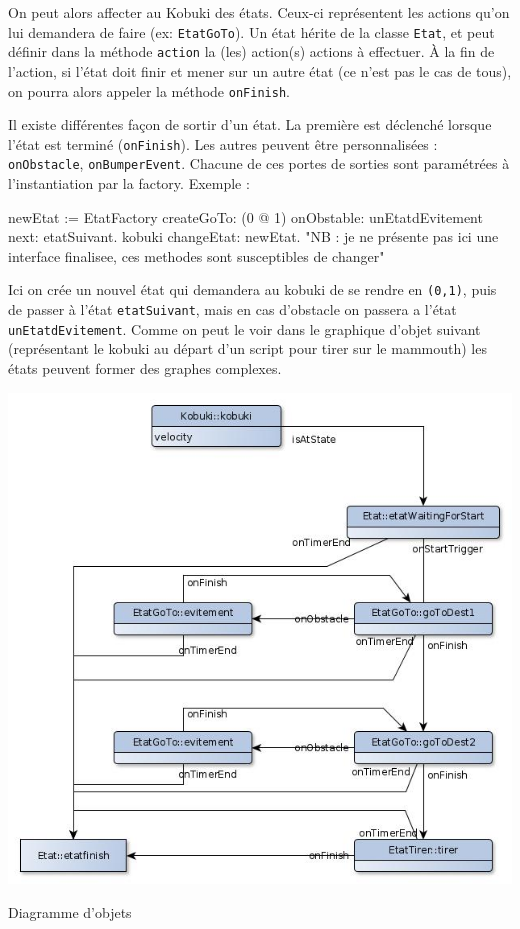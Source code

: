\documentclass[a4paper, 11pt]{article}
\begin{document}
On peut alors affecter au Kobuki des états. Ceux-ci représentent les
actions qu'on lui demandera de faire (ex: \texttt{EtatGoTo}). Un état
hérite de la classe \texttt{Etat}, et peut définir dans la méthode
\texttt{action} la (les) action(s) actions à effectuer. À la fin de
l'action, si l'état doit finir et mener sur un autre état (ce n'est
pas le cas de tous), on pourra alors appeler la méthode
\texttt{onFinish}. 

Il existe différentes façon de sortir d'un état. La première est
déclenché lorsque l'état est terminé (\texttt{onFinish}). Les autres
peuvent être personnalisées : \texttt{onObstacle},
\texttt{onBumperEvent}. Chacune de ces portes de sorties sont
paramétrées à l'instantiation par la factory. Exemple :

\begin{code}
  newEtat := EtatFactory createGoTo: (0 @ 1) onObstable: unEtatdEvitement next: etatSuivant.
  kobuki changeEtat: newEtat.
  "NB : je ne présente pas ici une interface finalisee, ces methodes sont susceptibles de changer"
\end{code}

Ici on crée un nouvel état qui demandera au kobuki de se rendre en
\texttt{(0,1)}, puis de passer à l'état \texttt{etatSuivant}, mais en
cas d'obstacle on passera a l'état \texttt{unEtatdEvitement}.  Comme
on peut le voir dans le graphique d'objet suivant (représentant le
kobuki au départ d'un script pour tirer sur le mammouth) les états
peuvent former des graphes complexes.
\begin{center}
  \includegraphics[width=\linewidth]{./UMLObjectEtat.jpg}
  \caption{Diagramme d'objets}
  \label{dia_obj}
\end{center}
\end{document}
